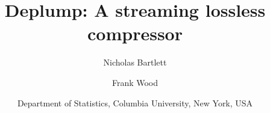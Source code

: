 \documentclass[oneside,letterpaper,12pt]{article}
\title{Deplump: A streaming lossless compressor}
\author{Nicholas Bartlett  \and Frank Wood}
\date{
\small Department of Statistics, Columbia University, New York, USA}
\begin{document}
\maketitle









%

%

%

%

%


\renewcommand{\bibsection}{\subsubsection*{References}}
\setlength{\bibsep}{0mm}


\end{document}
